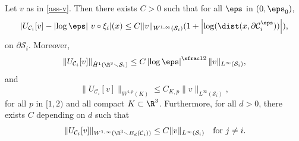 \begin{Lemma} \label{lem:dirac}
Let $v$ as in \eqref{ass-v}.
Then there exists $C > 0$ such that for all $\eps $ in $(0, \eps_0)$,
\begin{gather} \label{eq:U_i.boundary}
|U_{\mathcal C_i}[v] - \left|\log \eps \right|\, v \circ \xi_i |(x)
\leq C \|v\|_{W^{1,\infty} {(\mathcal S_i)}}(1 + \left|\log(\dist(x,\partial \mathcal C_i^\eps))\right|),
\end{gather}
on $\partial \mathcal S_i$.
Moreover,
\begin{equation} \label{eq:norm.U_i}
\|U_{\mathcal C_i}[v]\|_{\dot H^1(\R^3 \smallsetminus \mathcal S_i)} \leq C \left|\log \eps\right|^{\sfrac 1 2} \|v\|_{L^\infty(\mathcal S_i)},
\end{equation}
and
\begin{equation}
\label{eq:norm.U_i.subcritical}
\|U_{\mathcal C_i}[v]\|_{W^{1,p}(K)} \leq C_{K,p} \|v\|_{L^\infty{(\mathcal S_i)}},
\end{equation}
for all $p $ in $[1,2)$ and all compact $K \subset \R^3$.
Furthermore, for all $d>0$, there exists $C$ depending on $d$ such that
\begin{equation} \label{eq:norm.U_i-bis}
\, \|U_{\mathcal C_i}[v]\|_{{W^{1,\infty}}(\R^3 \smallsetminus B_d(\mathcal C_i))} \leq C \|v\|_{L^\infty{(\mathcal S_i)}} \quad \text{for} ~ j \neq i.
\end{equation}
\end{Lemma}
